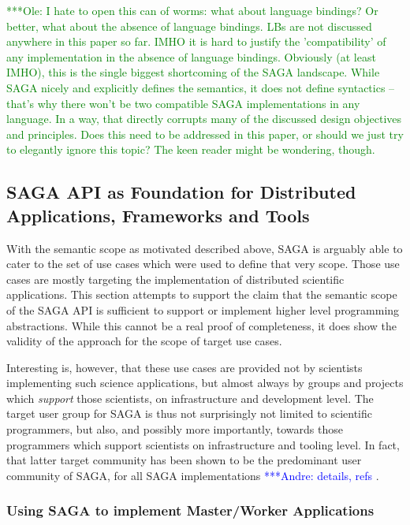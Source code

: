 \documentclass[a4paper,12pt]{article}
\newcommand{\amnote}[1]{   {\textcolor{blue} { ***Andre:    #1 }}}
\newcommand{\onote}[1]{    {\textcolor{green}{ ***Ole:      #1 }}}
\newcommand{\amnote}[1]{}
\newcommand{\onote}[1]{}
\newcommand{\I}[1]{\textit{#1}}
\begin{document}
\onote{I hate to open this can of worms: what about language bindings? Or
better, what about the absence of language bindings. LBs are not discussed
anywhere in this paper so far. IMHO it is hard to justify the 'compatibility'
of any implementation in the absence of language bindings.  Obviously (at least
IMHO), this is the single biggest shortcoming of the SAGA landscape. While SAGA
nicely and explicitly defines the semantics, it does not define syntactics --
that's why there won't be two compatible SAGA implementations in any language.
In a way, that directly corrupts many of the discussed design objectives and
principles.  Does this need to be addressed in this paper, or should we just
try to elegantly ignore this topic? The keen reader might be wondering,
though.}


 \subsection{SAGA API as Foundation for Distributed Applications,
 Frameworks and Tools}

  With the semantic scope as motivated described above, SAGA is
  arguably able to cater to the set of use cases which were used to
  define that very scope.  Those use cases are mostly targeting the
  implementation of distributed scientific applications.  This section
  attempts to support the claim that the semantic scope of the SAGA
  API is sufficient to support or implement higher level programming
  abstractions.  While this cannot be a real proof of completeness, it
  does show the validity of the approach for the scope of target use
  cases.

  Interesting is, however, that these use cases are provided not by
  scientists implementing such science applications, but almost always
  by groups and projects which \I{support} those scientists, on
  infrastructure and development level.  The target user group for
  SAGA is thus not surprisingly not limited to scientific programmers,
  but also, and possibly more importantly, towards those programmers
  which support scientists on infrastructure and tooling level.  In
  fact, that latter target community has been shown to be the
  predominant user community of SAGA, for all SAGA
  implementations\amnote{details, refs}.  

  \subsubsection*{Using SAGA to implement Master/Worker Applications}
\end{document}
